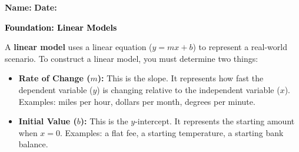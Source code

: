 \documentclass[12pt, letterpaper, fleqn]{article}
\begin{document}
\textbf{Name:} \underline{\hspace{5cm}}
\hfill
\textbf{Date:} \underline{\hspace{3cm}}\\

\begin{tcolorbox}[colback=customteal!20]
    \large\textcolor{black}{\textbf{Foundation: Linear Models}}
\end{tcolorbox}

\vspace{3mm}

\noindent
A \textbf{linear model} uses a linear equation ($y = mx + b$) to represent a real-world scenario. To construct a linear model, you must determine two things:

\begin{itemize}
    \item \textbf{Rate of Change ($m$):} This is the slope. It represents how fast the dependent variable ($y$) is changing relative to the independent variable ($x$). Examples: miles per hour, dollars per month, degrees per minute.
    \item \textbf{Initial Value ($b$):} This is the $y$-intercept. It represents the starting amount when $x = 0$. Examples: a flat fee, a starting temperature, a starting bank balance.
\end{itemize}

\vspace{4mm}
\end{document}
